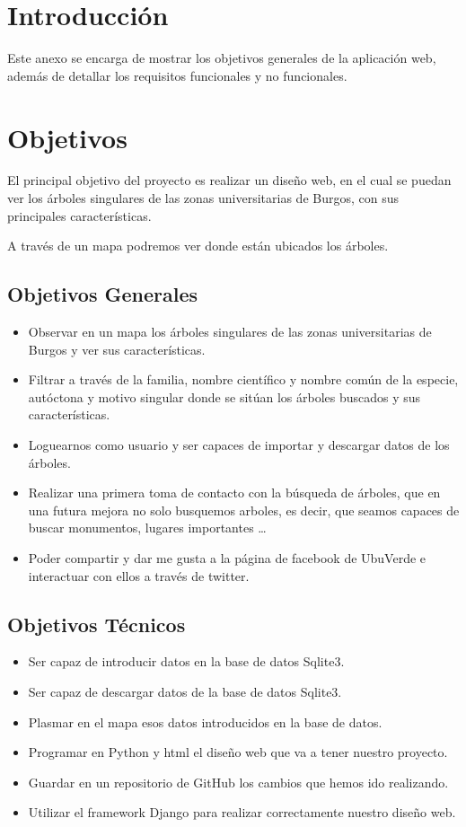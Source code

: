 
\section{Introducción}
Este anexo se encarga de mostrar los objetivos generales de la aplicación web, además de detallar los requisitos funcionales y no funcionales.

\section{Objetivos}
	El principal objetivo del proyecto es realizar un diseño web, en el cual se puedan ver los árboles singulares de las zonas universitarias de Burgos, con sus principales características.

	A través de un mapa podremos ver donde están ubicados los árboles. 
	\subsection{Objetivos Generales}
\begin{itemize}
	\item Observar en un mapa los árboles singulares de las zonas universitarias de Burgos y ver sus características.
	\item Filtrar a través de la familia, nombre científico y nombre común de la especie, autóctona y motivo singular donde se sitúan los árboles buscados y sus características.
	\item Loguearnos como usuario y ser capaces de importar y descargar datos de los árboles.
	\item Realizar una primera toma de contacto con la búsqueda de árboles, que en una futura mejora no solo busquemos arboles, es decir, que seamos capaces de buscar monumentos, lugares importantes \ldots
	\item Poder compartir y dar me gusta a la página de facebook de UbuVerde e interactuar con ellos a través de twitter. 
\end{itemize}

\subsection{Objetivos Técnicos}
\begin{itemize}
	\item Ser capaz de introducir datos en la base de datos Sqlite3.
	\item Ser capaz de descargar datos de la base de datos Sqlite3.
	\item Plasmar en el mapa esos datos introducidos en la base de datos. 
	\item Programar en Python y html el diseño web que va a tener nuestro proyecto.
	\item Guardar en un repositorio de GitHub los cambios que hemos ido realizando.
	\item Utilizar el framework Django para realizar correctamente nuestro diseño web.
	
\end{itemize}

